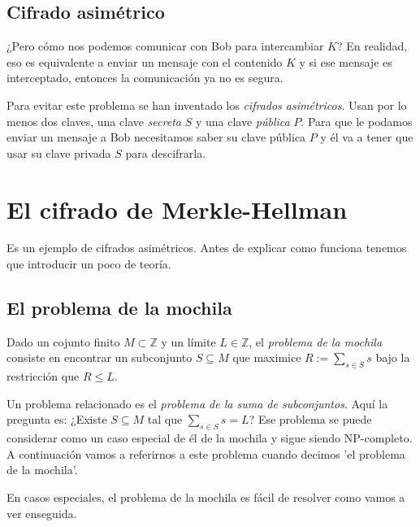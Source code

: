 \documentclass[12pt]{article}
\newcommand{\Z}{\mathbb{Z}}
\begin{document}
\subsection*{Cifrado asimétrico}

¿Pero cómo nos podemos comunicar con Bob para intercambiar $K$? En realidad, eso es equivalente a enviar un mensaje con el contenido $K$ y si ese mensaje es interceptado, entonces la comunicación ya no es segura.

Para evitar este problema se han inventado los \emph{cifrados asimétricos}. Usan por lo menos dos claves, una clave \emph{secreta} $S$ y una clave \emph{pública} $P$. Para que le podamos enviar un mensaje a Bob necesitamos saber su clave pública $P$ y él va a tener que usar su clave privada $S$ para descifrarla.

\section{El cifrado de Merkle-Hellman}

Es un ejemplo de cifrados asimétricos. Antes de explicar como funciona tenemos que introducir un poco de teoría.

\subsection*{El problema de la mochila}

Dado un cojunto finito $M \subset \Z$ y un límite $L \in \Z$, el \emph{problema de la mochila} consiste en encontrar un subconjunto $S \subseteq M$ que maximice $R := \sum_{s \in S}s$ bajo la restricción que $R \leq L$.

Un problema relacionado es el \emph{problema de la suma de subconjuntos}. Aquí la pregunta es: ¿Existe $S \subseteq M$ tal que $\sum_{s \in S}s = L$? Ese problema se puede considerar como un caso especial de él de la mochila y sigue siendo NP-completo. A continuación vamos a referirnos a este problema cuando decimos 'el problema de la mochila'.

En casos especiales, el problema de la mochila es fácil de resolver como vamos a ver enseguida.
\end{document}
